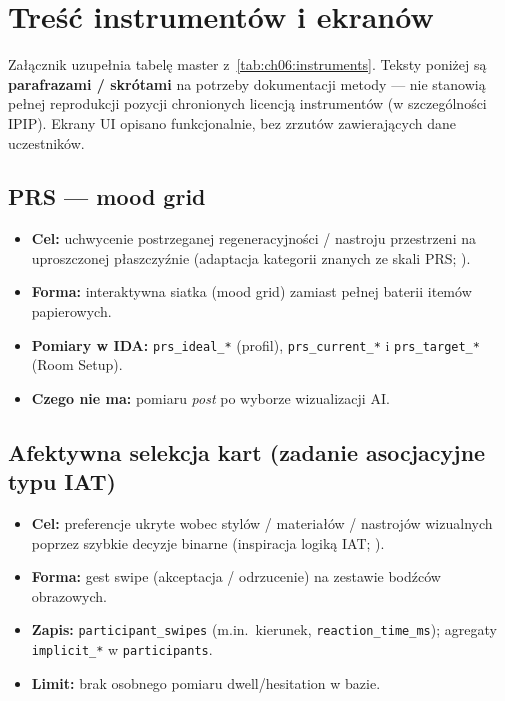 \chapter{Treść instrumentów i ekranów}
\label{app:b:top}

Załącznik uzupełnia tabelę master z~\cref{tab:ch06:instruments}. Teksty poniżej są \textbf{parafrazami / skrótami} na potrzeby dokumentacji metody --- nie stanowią pełnej reprodukcji pozycji chronionych licencją instrumentów (w szczególności IPIP). Ekrany UI opisano funkcjonalnie, bez zrzutów zawierających dane uczestników.

\section{PRS --- mood grid}
\label{app:b:sec:prs}

\begin{itemize}
  \item \textbf{Cel:} uchwycenie postrzeganej regeneracyjności / nastroju przestrzeni na uproszczonej płaszczyźnie (adaptacja kategorii znanych ze skali PRS; \cite{hartig1997prs}).
  \item \textbf{Forma:} interaktywna siatka (mood grid) zamiast pełnej baterii itemów papierowych.
  \item \textbf{Pomiary w IDA:} \texttt{prs\_ideal\_*} (profil), \texttt{prs\_current\_*} i \texttt{prs\_target\_*} (Room Setup).
  \item \textbf{Czego nie ma:} pomiaru \emph{post} po wyborze wizualizacji AI.
\end{itemize}

\section{Afektywna selekcja kart (zadanie asocjacyjne typu IAT)}
\label{app:b:sec:tinder}

\begin{itemize}
  \item \textbf{Cel:} preferencje ukryte wobec stylów / materiałów / nastrojów wizualnych poprzez szybkie decyzje binarne (inspiracja logiką IAT; \cite{greenwald1998iat}).
  \item \textbf{Forma:} gest swipe (akceptacja / odrzucenie) na zestawie bodźców obrazowych.
  \item \textbf{Zapis:} \texttt{participant\_swipes} (m.in.\ kierunek, \texttt{reaction\_time\_ms}); agregaty \texttt{implicit\_*} w \texttt{participants}.
  \item \textbf{Limit:} brak osobnego pomiaru dwell/hesitation w bazie.
\end{itemize}

